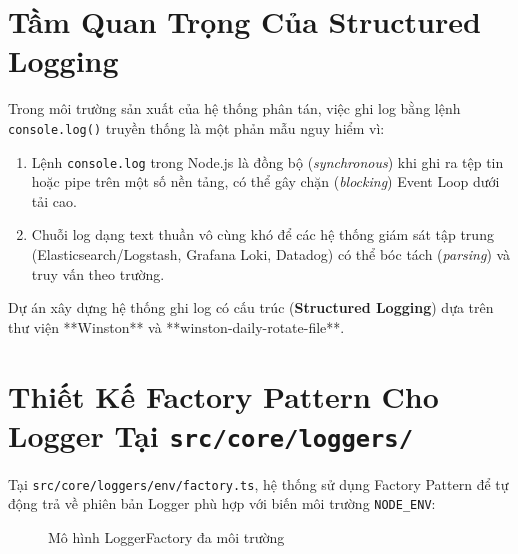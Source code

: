 \documentclass[12pt,a4paper,oneside]{book}
\begin{document}
\section{Tầm Quan Trọng Của Structured Logging}
Trong môi trường sản xuất của hệ thống phân tán, việc ghi log bằng lệnh \texttt{console.log()} truyền thống là một phản mẫu nguy hiểm vì:
\begin{enumerate}
  \item Lệnh \texttt{console.log} trong Node.js là đồng bộ (\textit{synchronous}) khi ghi ra tệp tin hoặc pipe trên một số nền tảng, có thể gây chặn (\textit{blocking}) Event Loop dưới tải cao.
  \item Chuỗi log dạng text thuần vô cùng khó để các hệ thống giám sát tập trung (Elasticsearch/Logstash, Grafana Loki, Datadog) có thể bóc tách (\textit{parsing}) và truy vấn theo trường.
\end{enumerate}

Dự án xây dựng hệ thống ghi log có cấu trúc (\textbf{Structured Logging}) dựa trên thư viện **Winston** và **winston-daily-rotate-file**.

\section{Thiết Kế Factory Pattern Cho Logger Tại \texttt{src/core/loggers/}}
Tại \texttt{src/core/loggers/env/factory.ts}, hệ thống sử dụng Factory Pattern để tự động trả về phiên bản Logger phù hợp với biến môi trường \texttt{NODE\_ENV}:

\begin{figure}[htbp]
  \centering
  \caption{Mô hình LoggerFactory đa môi trường}
  \label{fig:logger-factory-pedagogy}
\end{figure}
\end{document}
